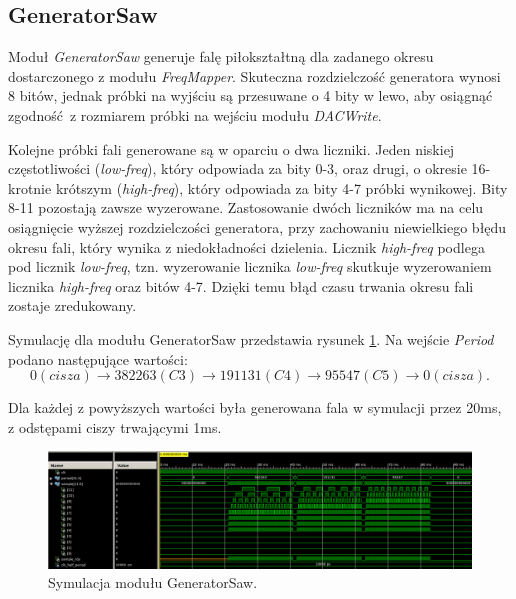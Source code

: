 \documentclass[12pt]{article}
\begin{document}
\clearpage

\subsection{GeneratorSaw}

Moduł \textit{GeneratorSaw} generuje falę piłokształtną dla zadanego okresu dostarczonego z modułu \textit{FreqMapper}. Skuteczna rozdzielczość generatora wynosi 8 bitów, jednak próbki na wyjściu są przesuwane o 4 bity w lewo, aby osiągnąć zgodność z rozmiarem próbki na wejściu modułu \textit{DACWrite}. 

Kolejne próbki fali generowane są w oparciu o dwa liczniki. Jeden niskiej częstotliwości (\textit{low-freq}), który odpowiada za bity 0-3, oraz drugi, o okresie 16-krotnie krótszym (\textit{high-freq}), który odpowiada za bity 4-7 próbki wynikowej. Bity 8-11 pozostają zawsze wyzerowane. Zastosowanie dwóch liczników ma na celu osiągnięcie wyższej rozdzielczości generatora, przy zachowaniu niewielkiego błędu okresu fali, który wynika z niedokładności dzielenia. Licznik \textit{high-freq} podlega pod licznik \textit{low-freq}, tzn. wyzerowanie licznika \textit{low-freq} skutkuje wyzerowaniem licznika \textit{high-freq} oraz bitów 4-7. Dzięki temu błąd czasu trwania okresu fali zostaje zredukowany.

Symulację dla modułu GeneratorSaw przedstawia rysunek \ref{sim:gen_saw}. Na wejście \textit{Period} podano następujące wartości: 
\begin{equation}
  0 (cisza) \rightarrow 382263 (C3) \rightarrow 191131 (C4) \rightarrow 95547 (C5) \rightarrow 0 (cisza).
\end{equation}

Dla każdej z powyższych wartości była generowana fala w symulacji przez 20ms, z odstępami ciszy trwającymi 1ms.

\begin{figure}[H]
  \centering
  \includegraphics[decodearray={1 0 1 0 1 0}, width=\linewidth]{images/generator_saw.png}
  \caption{Symulacja modułu GeneratorSaw.}
  \label{sim:gen_saw}
\end{figure}
\end{document}
